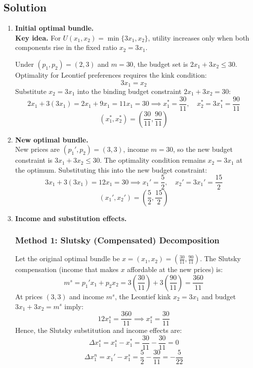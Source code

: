 \documentclass[12pt]{article}
\begin{document}
\bigskip\bigskip

\subsection*{Solution}

\begin{enumerate}[label=(\alph*)]

\item \textbf{Initial optimal bundle.} \\
\noindent\textbf{Key idea.} For $U(x_1,x_2)=\min\{3x_1,x_2\}$, utility increases only when both components rise in the fixed ratio $x_2=3x_1$.

Under $(p_1,p_2)=(2,3)$ and $m=30$, the budget set is $2x_1+3x_2\le 30$.
Optimality for Leontief preferences requires the kink condition:
$$3x_1=x_2$$
Substitute $x_2=3x_1$ into the binding budget constraint $2x_1+3x_2=30$:
$$2x_1+3(3x_1)=2x_1+9x_1=11x_1=30 \implies x_1^*=\frac{30}{11}, \quad x_2^*=3x_1^*=\frac{90}{11}$$
$$\boxed{(x_1^*,x_2^*)=\left(\frac{30}{11},\frac{90}{11}\right)}$$

\item \textbf{New optimal bundle.} \\
New prices are $(p_1',p_2)=(3,3)$, income $m=30$, so the new budget constraint is $3x_1+3x_2 \le 30$.
The optimality condition remains $x_2=3x_1$ at the optimum. Substituting this into the new budget constraint:
$$3x_1+3(3x_1)=12x_1=30 \implies x_1'=\frac{5}{2}, \quad x_2'=3x_1'=\frac{15}{2}$$
$$\boxed{(x_1',x_2')=\left(\frac{5}{2},\frac{15}{2}\right)}$$

\newpage
\item \textbf{Income and substitution effects.} 

\subsubsection*{Method 1: Slutsky (Compensated) Decomposition}
Let the original optimal bundle be $x=(x_1,x_2)=\left(\frac{30}{11},\frac{90}{11}\right)$.
The Slutsky compensation (income that makes $x$ affordable at the new prices) is:
$$m^s = p_1' x_1 + p_2 x_2 = 3\left(\frac{30}{11}\right) + 3\left(\frac{90}{11}\right) = \frac{360}{11}$$
At prices $(3,3)$ and income $m^s$, the Leontief kink $x_2=3x_1$ and budget $3x_1+3x_2=m^s$ imply:
$$12x_1^s = \frac{360}{11} \implies x_1^s=\frac{30}{11}$$
Hence, the Slutsky substitution and income effects are:
$$\Delta x_1^{s} = x_1^s-x_1^*=\frac{30}{11}-\frac{30}{11}=0$$
$$\Delta x_1^{n} = x_1'-x_1^s=\frac{5}{2}-\frac{30}{11}=-\frac{5}{22}$$


\end{enumerate}
\end{document}
